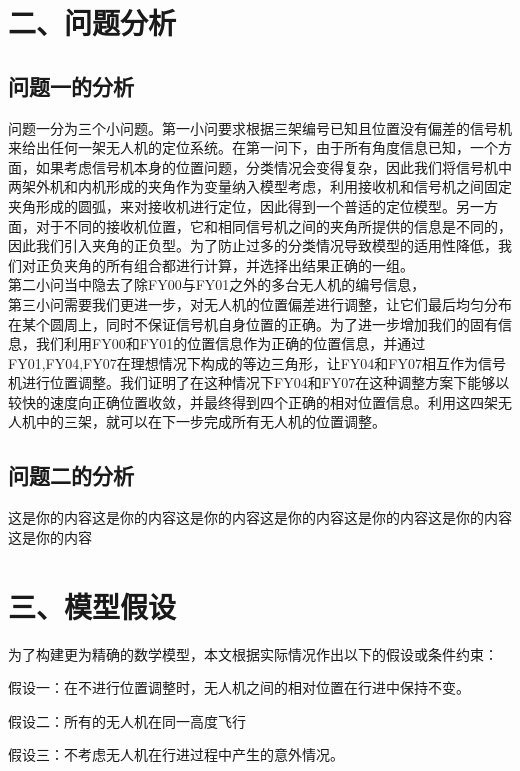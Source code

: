 \documentclass{my_paper}
\begin{document}
\section{二、问题分析}
\subsection{问题一的分析}
问题一分为三个小问题。第一小问要求根据三架编号已知且位置没有偏差的信号机来给出任何一架无人机的定位系统。在第一问下，由于所有角度信息已知，一个方面，如果考虑信号机本身的位置问题，分类情况会变得复杂，因此我们将信号机中两架外机和内机形成的夹角作为变量纳入模型考虑，利用接收机和信号机之间固定夹角形成的圆弧，来对接收机进行定位，因此得到一个普适的定位模型。另一方面，对于不同的接收机位置，它和相同信号机之间的夹角所提供的信息是不同的，因此我们引入夹角的正负型。为了防止过多的分类情况导致模型的适用性降低，我们对正负夹角的所有组合都进行计算，并选择出结果正确的一组。\\

第二小问当中隐去了除FY00与FY01之外的多台无人机的编号信息，\\

第三小问需要我们更进一步，对无人机的位置偏差进行调整，让它们最后均匀分布在某个圆周上，同时不保证信号机自身位置的正确。为了进一步增加我们的固有信息，我们利用FY00和FY01的位置信息作为正确的位置信息，并通过FY01,FY04,FY07在理想情况下构成的等边三角形，让FY04和FY07相互作为信号机进行位置调整。我们证明了在这种情况下FY04和FY07在这种调整方案下能够以较快的速度向正确位置收敛，并最终得到四个正确的相对位置信息。利用这四架无人机中的三架，就可以在下一步完成所有无人机的位置调整。
\subsection{问题二的分析}
这是你的内容这是你的内容这是你的内容这是你的内容这是你的内容这是你的内容这是你的内容
\section{三、模型假设}

为了构建更为精确的数学模型，本文根据实际情况作出以下的假设或条件约束：

假设一：在不进行位置调整时，无人机之间的相对位置在行进中保持不变。

假设二：所有的无人机在同一高度飞行

假设三：不考虑无人机在行进过程中产生的意外情况。
\end{document}
